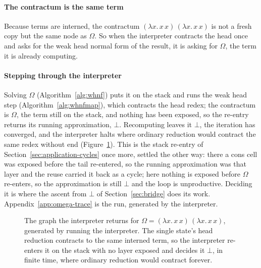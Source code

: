 \paragraph{The contractum is the same term}
Because terms are interned, the contractum $(\lambda x.\,x\,x)\,(\lambda x.\,x\,x)$ is not a fresh copy but the same node as $\Omega$. So when the interpreter contracts the head once and asks for the weak head normal form of the result, it is asking for $\Omega$, the term it is already computing.

\paragraph{Stepping through the interpreter}
Solving $\Omega$ (Algorithm~\ref{alg:whnf}) puts it on the stack and runs the weak head step (Algorithm~\ref{alg:whnfmap}), which contracts the head redex; the contractum is $\Omega$, the term still on the stack, and nothing has been exposed, so the re-entry returns its running approximation, $\bot$. Recomputing leaves it $\bot$, the iteration has converged, and the interpreter halts where ordinary reduction would contract the same redex without end (Figure~\ref{fig:omega}). This is the stack re-entry of Section~\ref{sec:application-cycles} once more, settled the other way: there a cons cell was exposed before the tail re-entered, so the running approximation was that layer and the reuse carried it back as a cycle; here nothing is exposed before $\Omega$ re-enters, so the approximation is still $\bot$ and the loop is unproductive. Deciding it is where the ascent from $\bot$ of Section~\ref{sec:bridge} does its work. Appendix~\ref{app:omega-trace} is the run, generated by the interpreter.

\begin{figure}
  \centering
  
  \caption{The graph the interpreter returns for $\Omega = (\lambda x.\,x\,x)\,(\lambda x.\,x\,x)$, generated by running
    the interpreter. The single state's head reduction contracts to the same interned term, so the interpreter
    re-enters it on the stack with no layer exposed and decides it $\bot$, in finite time, where ordinary
  reduction would contract forever.}
  \label{fig:omega}
\end{figure}

